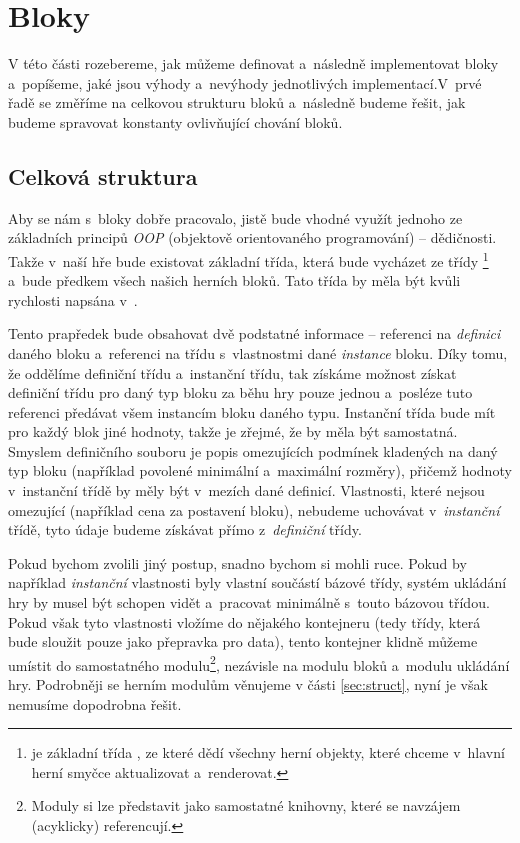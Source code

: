 
\section{Bloky}

V této části rozebereme, jak můžeme definovat a~následně implementovat bloky a~popíšeme, jaké jsou výhody a~nevýhody jednotlivých implementací.\linebreak V~prvé řadě se změříme na celkovou strukturu bloků a~následně budeme řešit, jak budeme spravovat konstanty ovlivňující chování bloků.

\subsection{Celková struktura}

Aby se nám s~bloky dobře pracovalo, jistě bude vhodné využít jednoho ze základních principů \textit{OOP} (objektově orientovaného programování) -- dědičnosti. Takže v~naší hře bude existovat základní třída, která bude vycházet ze třídy \footnote{ je základní třída \UEu{}, ze které dědí všechny herní objekty, které chceme v~hlavní herní smyčce aktualizovat a~renderovat.} a~bude předkem všech našich herních bloků. Tato třída by měla být kvůli rychlosti napsána v~\CPP{}.

Tento prapředek bude obsahovat dvě podstatné informace -- referenci na \textit{definici} daného bloku a~referenci na třídu s~vlastnostmi dané \textit{instance} bloku. Díky tomu, že oddělíme definiční třídu a~instanční třídu, tak získáme možnost získat definiční třídu pro daný typ bloku za běhu hry pouze jednou a~posléze tuto referenci předávat všem instancím bloku daného typu. Instanční třída bude mít pro každý blok jiné hodnoty, takže je zřejmé, že by měla být samostatná. Smyslem definičního souboru je popis omezujících podmínek kladených na daný typ bloku (například povolené minimální a~maximální rozměry), přičemž hodnoty v~instanční třídě by měly být v~mezích dané definicí. Vlastnosti, které nejsou omezující (například cena za postavení bloku), nebudeme uchovávat v~\textit{instanční} třídě, tyto údaje budeme získávat přímo z~\textit{definiční} třídy.

Pokud bychom zvolili jiný postup, snadno bychom si mohli  ruce. Pokud by například \textit{instanční} vlastnosti byly vlastní součástí bázové třídy, systém ukládání hry by musel být schopen vidět a~pracovat minimálně s~touto bázovou třídou. Pokud však tyto vlastnosti vložíme do nějakého kontejneru (tedy třídy, která bude sloužit pouze jako přepravka pro data), tento kontejner klidně můžeme umístit do samostatného modulu\footnote{Moduly si lze představit jako samostatné knihovny, které se navzájem (acyklicky) referencují.}, nezávisle na modulu bloků a~modulu ukládání hry.  Podrobněji se herním modulům věnujeme v části \ref{sec:struct}, nyní je však nemusíme dopodrobna řešit.


